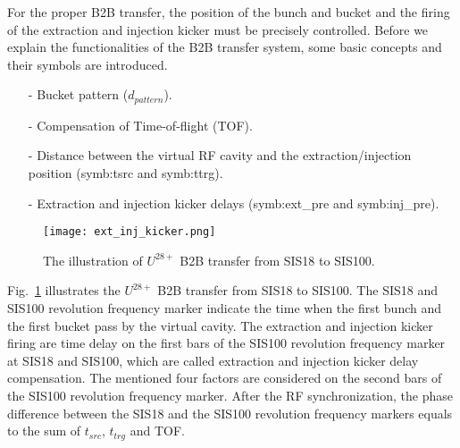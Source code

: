 For the proper B2B transfer, the position of the bunch and bucket and the firing of the extraction and injection kicker must be precisely controlled. Before we explain the functionalities of the B2B transfer system, some basic concepts and their symbols are introduced.

\begin{itemize}
\item[-] Bucket pattern ($d_{pattern}$).
\item[-] Compensation of Time-of-flight (\gls{TOF}). 
\item[-] Distance between the virtual RF cavity and the extraction/injection position  (\gls{symb:tsrc} and \gls{symb:ttrg}). 
\item[-] Extraction and injection kicker delays (\gls{symb:ext_pre} and \gls{symb:inj_pre}).
\end{itemize}
\begin{figure}[!htb]
   \centering   
   \texttt{[image: ext\_inj\_kicker.png]}
   \caption{The illustration of $U^{28+}$ B2B transfer from SIS18 to SIS100.}
   \label{ext_inj_kicker}
\end{figure}
Fig.~\ref{ext_inj_kicker} illustrates the $U^{28+}$ B2B transfer from SIS18 to SIS100. The SIS18 and SIS100 revolution frequency marker indicate the time when the first bunch and the first bucket pass by the virtual cavity. The extraction and injection kicker firing are time delay on the first bars of the SIS100 revolution frequency marker at SIS18 and SIS100, which are called extraction and injection kicker delay compensation. The mentioned four factors are considered on the second bars of the SIS100 revolution frequency marker. After the RF synchronization, the phase difference between the SIS18 and the SIS100 revolution frequency markers equals to the sum of $t_{src}$, $t_{trg}$ and TOF.   
